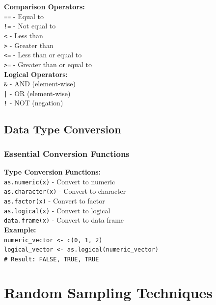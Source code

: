 \documentclass[11pt,a4paper]{article}
\begin{document}
\begin{formulabox}
\textbf{Comparison Operators:}\\
\texttt{==} - Equal to\\
\texttt{!=} - Not equal to\\
\texttt{<} - Less than\\
\texttt{>} - Greater than\\
\texttt{<=} - Less than or equal to\\
\texttt{>=} - Greater than or equal to\\[0.3cm]
\textbf{Logical Operators:}\\
\texttt{\&} - AND (element-wise)\\
\texttt{|} - OR (element-wise)\\
\texttt{!} - NOT (negation)
\end{formulabox}

\subsection{Data Type Conversion}

\subsubsection{Essential Conversion Functions}

\begin{formulabox}
\textbf{Type Conversion Functions:}\\
\texttt{as.numeric(x)} - Convert to numeric\\
\texttt{as.character(x)} - Convert to character\\
\texttt{as.factor(x)} - Convert to factor\\
\texttt{as.logical(x)} - Convert to logical\\
\texttt{data.frame(x)} - Convert to data frame\\[0.3cm]
\textbf{Example:}\\
\texttt{numeric\_vector <- c(0, 1, 2)}\\
\texttt{logical\_vector <- as.logical(numeric\_vector)}\\
\texttt{# Result: FALSE, TRUE, TRUE}
\end{formulabox}

\section{Random Sampling Techniques}
\end{document}
